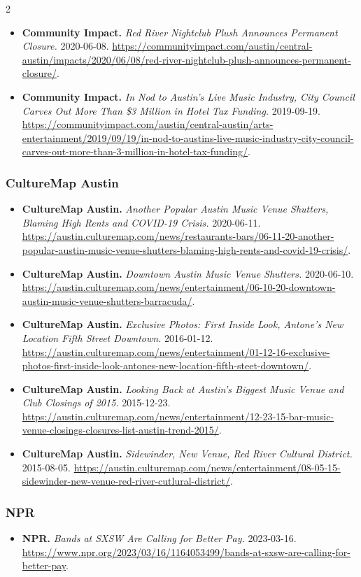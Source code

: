 {\begin{multicols}{2}
\begin{itemize}[itemsep=0pt,topsep=1pt,parsep=0pt,partopsep=0pt,leftmargin=1em]
\item \textbf{Community Impact.} \textit{Red River Nightclub Plush Announces Permanent Closure.} 2020-06-08. \url{https://communityimpact.com/austin/central-austin/impacts/2020/06/08/red-river-nightclub-plush-announces-permanent-closure/}.
\item \textbf{Community Impact.} \textit{In Nod to Austin’s Live Music Industry, City Council Carves Out More Than \$3 Million in Hotel Tax Funding.} 2019-09-19. \url{https://communityimpact.com/austin/central-austin/arts-entertainment/2019/09/19/in-nod-to-austins-live-music-industry-city-council-carves-out-more-than-3-million-in-hotel-tax-funding/}.
\end{itemize}
\subsubsection*{CultureMap Austin}
\begin{itemize}[itemsep=0pt,topsep=1pt,parsep=0pt,partopsep=0pt,leftmargin=1em]
\item \textbf{CultureMap Austin.} \textit{Another Popular Austin Music Venue Shutters, Blaming High Rents and COVID-19 Crisis.} 2020-06-11. \url{https://austin.culturemap.com/news/restaurants-bars/06-11-20-another-popular-austin-music-venue-shutters-blaming-high-rents-and-covid-19-crisis/}.
\item \textbf{CultureMap Austin.} \textit{Downtown Austin Music Venue Shutters.} 2020-06-10. \url{https://austin.culturemap.com/news/entertainment/06-10-20-downtown-austin-music-venue-shutters-barracuda/}.
\item \textbf{CultureMap Austin.} \textit{Exclusive Photos: First Inside Look, Antone’s New Location Fifth Street Downtown.} 2016-01-12. \url{https://austin.culturemap.com/news/entertainment/01-12-16-exclusive-photos-first-inside-look-antones-new-location-fifth-steet-downtown/}.
\item \textbf{CultureMap Austin.} \textit{Looking Back at Austin’s Biggest Music Venue and Club Closings of 2015.} 2015-12-23. \url{https://austin.culturemap.com/news/entertainment/12-23-15-bar-music-venue-closings-closures-list-austin-trend-2015/}.
\item \textbf{CultureMap Austin.} \textit{Sidewinder, New Venue, Red River Cultural District.} 2015-08-05. \url{https://austin.culturemap.com/news/entertainment/08-05-15-sidewinder-new-venue-red-river-cutlural-district/}.
\end{itemize}
\subsubsection*{NPR}
\begin{itemize}[itemsep=0pt,topsep=1pt,parsep=0pt,partopsep=0pt,leftmargin=1em]
\item \textbf{NPR.} \textit{Bands at SXSW Are Calling for Better Pay.} 2023-03-16. \url{https://www.npr.org/2023/03/16/1164053499/bands-at-sxsw-are-calling-for-better-pay}.
\end{itemize}

\end{multicols}}
